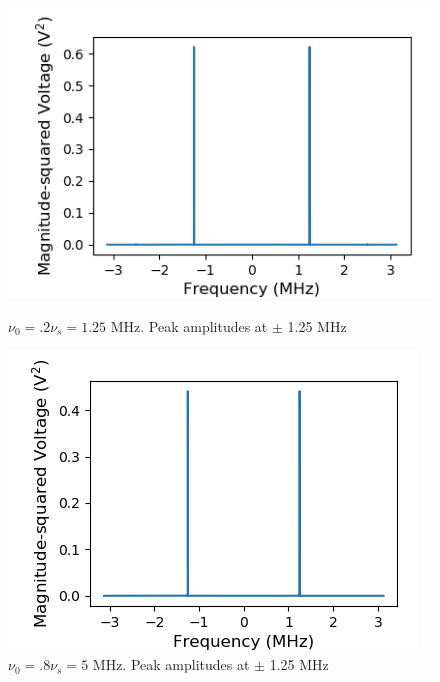 \documentclass[a4paper]{article}
\begin{document}
\begin{figure}
\centering
\begin{minipage}{.5\textwidth}
	\centering
	\includegraphics[width=.8\linewidth]{5-2/pow2}
	\caption{$\nu_0 = .2 \nu_s = 1.25$ MHz. \hfill \break Peak amplitudes at $\pm$ 1.25 MHz}
	\label{fig:NyPw2}
\end{minipage}%
\begin{minipage}{.5\textwidth}
	\centering
	\includegraphics[width=.8\linewidth]{5-2/pow8}
	\caption{$\nu_0 = .8 \nu_s = 5$ MHz. \hfill \break Peak amplitudes at $\pm$ 1.25 MHz}
	\label{fig:NyPw8}
\end{minipage}
\end{figure}
\end{document}
